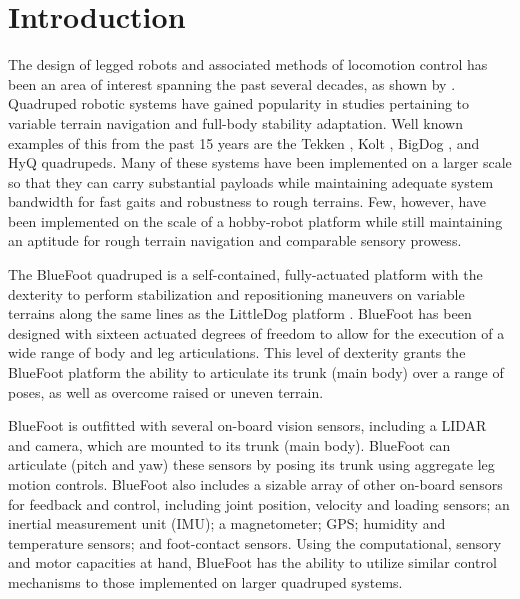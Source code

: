 \chapter{Introduction}
	\label{ch::introduction}

		The design of legged robots and associated methods of locomotion control has been an area of interest spanning the past several decades, as shown by \cite{McGhee1965,Hodgins1991,Altendorfer2001,Kolter2008,Wieber2015}. Quadruped robotic systems have gained popularity in studies pertaining to variable terrain navigation and full-body stability adaptation. Well known examples of this from the past 15 years are the Tekken \cite{Fukuoka2003}, Kolt \cite{Estremera2006}, BigDog \cite{BigDog2008}, and HyQ \cite{Semini2010_PHD} quadrupeds. Many of these systems have been implemented on a larger scale so that they can carry substantial payloads while maintaining adequate system bandwidth for fast gaits and robustness to rough terrains. Few, however, have been implemented on the scale of a hobby-robot platform while still maintaining an aptitude for rough terrain navigation and comparable sensory prowess.

		The BlueFoot quadruped is a self-contained, fully-actuated platform with the dexterity to perform stabilization and repositioning maneuvers on variable terrains along the same lines as the LittleDog platform \cite{Rebula2007}. BlueFoot has been designed with sixteen actuated degrees of freedom to allow for the execution of a wide range of body and leg articulations. This level of dexterity grants the BlueFoot platform the ability to articulate its trunk (main body) over a range of poses, as well as overcome raised or uneven terrain. 

		BlueFoot is outfitted with several on-board vision sensors, including a LIDAR and camera, which are mounted to its trunk (main body). BlueFoot can articulate (\IE pitch and yaw) these sensors by posing its trunk using aggregate leg motion controls. BlueFoot also includes a sizable array of other on-board sensors for feedback and control, including joint position, velocity and loading sensors; an inertial measurement unit (IMU); a magnetometer; GPS; humidity and temperature sensors; and foot-contact sensors. Using the computational, sensory and motor capacities at hand, BlueFoot has the ability to utilize similar control mechanisms to those implemented on larger quadruped systems. 

